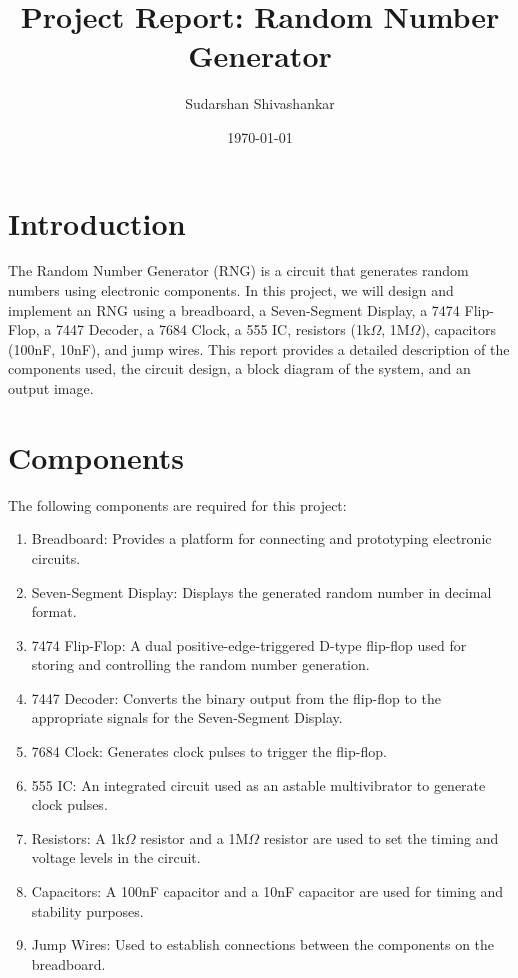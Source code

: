 \documentclass{article}
\begin{document}
\title{Project Report: Random Number Generator}
\author{Sudarshan Shivashankar}
\date{\today}

\maketitle

\section{Introduction}
The Random Number Generator (RNG) is a circuit that generates random numbers using electronic components. In this project, we will design and implement an RNG using a breadboard, a Seven-Segment Display, a 7474 Flip-Flop, a 7447 Decoder, a 7684 Clock, a 555 IC, resistors (1k$\Omega$, 1M$\Omega$), capacitors (100nF, 10nF), and jump wires. This report provides a detailed description of the components used, the circuit design, a block diagram of the system, and an output image.

\section{Components}
The following components are required for this project:
\begin{enumerate}
  \item Breadboard: Provides a platform for connecting and prototyping electronic circuits.
  \item Seven-Segment Display: Displays the generated random number in decimal format.
  \item 7474 Flip-Flop: A dual positive-edge-triggered D-type flip-flop used for storing and controlling the random number generation.
  \item 7447 Decoder: Converts the binary output from the flip-flop to the appropriate signals for the Seven-Segment Display.
  \item 7684 Clock: Generates clock pulses to trigger the flip-flop.
  \item 555 IC: An integrated circuit used as an astable multivibrator to generate clock pulses.
  \item Resistors: A 1k$\Omega$ resistor and a 1M$\Omega$ resistor are used to set the timing and voltage levels in the circuit.
  \item Capacitors: A 100nF capacitor and a 10nF capacitor are used for timing and stability purposes.
  \item Jump Wires: Used to establish connections between the components on the breadboard.
\end{enumerate}
\end{document}
